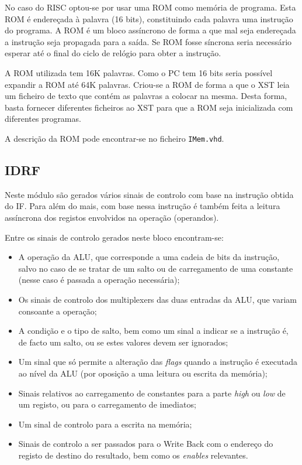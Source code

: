 \documentclass[a4paper]{article}
\begin{document}
			No caso do \textmu RISC optou-se por usar uma ROM como memória de programa. Esta ROM é endereçada à palavra (16 bits), constituindo cada palavra uma instrução do programa. A ROM é um bloco assíncrono de forma a que mal seja endereçada a instrução seja propagada para a saída. Se ROM fosse síncrona seria necessário esperar até o final do ciclo de relógio para obter a instrução.
			
			A ROM utilizada tem 16K palavras. Como o PC tem 16 bits seria possível expandir a ROM até 64K palavras. Criou-se a ROM de forma a que o XST leia um ficheiro de texto que contém as palavras a colocar na mesma. Desta forma, basta fornecer diferentes ficheiros ao XST para que a ROM seja inicializada com diferentes programas.
			
			A descrição da ROM pode encontrar-se no ficheiro \texttt{IMem.vhd}.


		\subsection{IDRF}
			
			Neste módulo são gerados vários sinais de controlo com base na instrução obtida do IF. Para além do mais, com base nessa instrução é também feita a leitura assíncrona dos registos envolvidos na operação (operandos).
			
			Entre os sinais de controlo gerados neste bloco encontram-se:
			
			\begin{itemize}
				\item A operação da ALU, que corresponde a uma cadeia de bits da instrução, salvo no caso de se tratar de um salto ou de carregamento de uma constante (nesse caso é passada a operação necessária);
				\item Os sinais de controlo dos multiplexers das duas entradas da ALU, que variam consoante a operação;
				\item A condição e o tipo de salto, bem como um sinal a indicar se a instrução é, de facto um salto, ou se estes valores devem ser ignorados;
				\item Um sinal que só permite a alteração das \textit{flags} quando a instrução é executada ao nível da ALU (por oposição a uma leitura ou escrita da memória);
				\item Sinais relativos ao carregamento de constantes para a parte \textit{high} ou \textit{low} de um registo, ou para o carregamento de imediatos;
				\item Um sinal de controlo para a escrita na memória;
				\item Sinais de controlo a ser passados para o Write Back com o endereço do registo de destino do resultado, bem como os \textit{enables} relevantes.
			\end{itemize}
			
\end{document}

